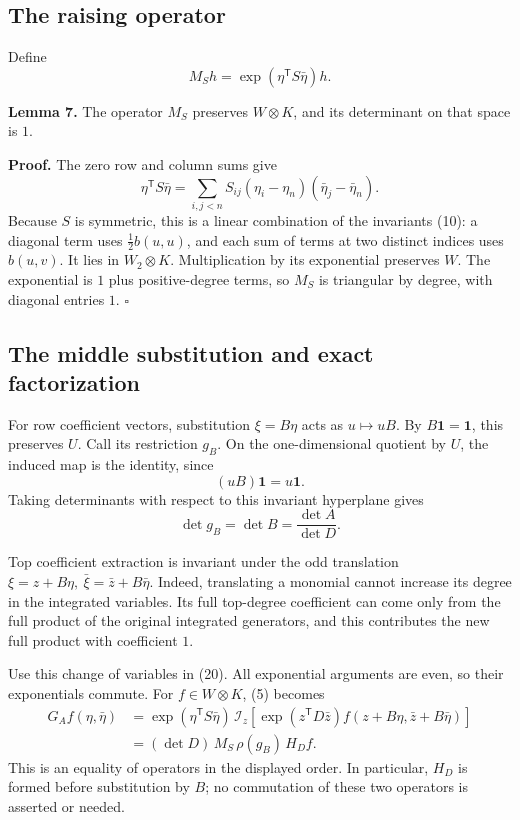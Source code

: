 \documentclass[11pt]{article}
\begin{document}
\subsection{The raising operator}\label{the-raising-operator}

Define \[
M_Sh=\exp(\eta^{\mathsf T}S\bar\eta)h.
\tag{23}
\]

\textbf{Lemma 7.} The operator \(M_S\) preserves \(W\otimes K\), and its determinant on that space is \(1\).

\textbf{Proof.} The zero row and column sums give \[
\eta^{\mathsf T}S\bar\eta
=\sum_{i,j<n}S_{ij}(\eta_i-\eta_n)(\bar\eta_j-\bar\eta_n).
\tag{24}
\] Because \(S\) is symmetric, this is a linear combination of the invariants (10): a diagonal term uses \(\tfrac12b(u,u)\), and each sum of terms at two distinct indices uses \(b(u,v)\). It lies in \(W_2\otimes K\). Multiplication by its exponential preserves \(W\). The exponential is \(1\) plus positive-degree terms, so \(M_S\) is triangular by degree, with diagonal entries \(1\). \(\square\)

\subsection{The middle substitution and exact factorization}\label{the-middle-substitution-and-exact-factorization}

For row coefficient vectors, substitution \(\xi=B\eta\) acts as \(u\mapsto uB\). By \(B\mathbf1=\mathbf1\), this preserves \(U\). Call its restriction \(g_B\). On the one-dimensional quotient by \(U\), the induced map is the identity, since \[
(uB)\mathbf1=u\mathbf1.
\] Taking determinants with respect to this invariant hyperplane gives \[
\det g_B=\det B=\frac{\det A}{\det D}.
\tag{25}
\]

Top coefficient extraction is invariant under the odd translation \(\xi=z+B\eta,\ \bar\xi=\bar z+B\bar\eta\). Indeed, translating a monomial cannot increase its degree in the integrated variables. Its full top-degree coefficient can come only from the full product of the original integrated generators, and this contributes the new full product with coefficient \(1\).

Use this change of variables in (20). All exponential arguments are even, so their exponentials commute. For \(f\in W\otimes K\), (5) becomes \[
\begin{aligned}
G_Af(\eta,\bar\eta)
&=\exp(\eta^{\mathsf T}S\bar\eta)\,
 \mathcal I_z\left[\exp(z^{\mathsf T}D\bar z)
 f(z+B\eta,\bar z+B\bar\eta)\right]\\
&=(\det D)\,M_S\,\rho(g_B)\,H_D f.
\end{aligned}
\tag{26}
\] This is an equality of operators in the displayed order. In particular, \(H_D\) is formed before substitution by \(B\); no commutation of these two operators is asserted or needed.
\end{document}
